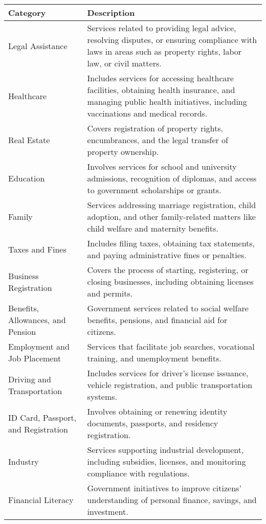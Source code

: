 
\begin{table}[]
\scriptsize
    \centering
    \begin{tabular}{p{}p{}}
    \toprule
\textbf{Category} & \textbf{Description} \\  
\midrule
Legal Assistance & Services related to providing legal advice, resolving disputes, or ensuring compliance with laws in areas such as property rights, labor law, or civil matters. \\  \midrule
Healthcare & Includes services for accessing healthcare facilities, obtaining health insurance, and managing public health initiatives, including vaccinations and medical records. \\  \midrule
Real Estate & Covers registration of property rights, encumbrances, and the legal transfer of property ownership. \\  \midrule
Education & Involves services for school and university admissions, recognition of diplomas, and access to government scholarships or grants. \\  \midrule
Family & Services addressing marriage registration, child adoption, and other family-related matters like child welfare and maternity benefits. \\  \midrule
Taxes and Fines & Includes filing taxes, obtaining tax statements, and paying administrative fines or penalties. \\  \midrule
Business Registration & Covers the process of starting, registering, or closing businesses, including obtaining licenses and permits. \\  \midrule
Benefits, Allowances, and Pension & Government services related to social welfare benefits, pensions, and financial aid for citizens. \\  \midrule
Employment and Job Placement & Services that facilitate job searches, vocational training, and unemployment benefits. \\  \midrule
Driving and Transportation & Includes services for driver’s license issuance, vehicle registration, and public transportation systems. \\  \midrule
ID Card, Passport, and Registration & Involves obtaining or renewing identity documents, passports, and residency registration. \\  \midrule
Industry & Services supporting industrial development, including subsidies, licenses, and monitoring compliance with regulations. \\  \midrule
Financial Literacy & Government initiatives to improve citizens' understanding of personal finance, savings, and investment. \\  \midrule

\end{tabular}
\end{table}
